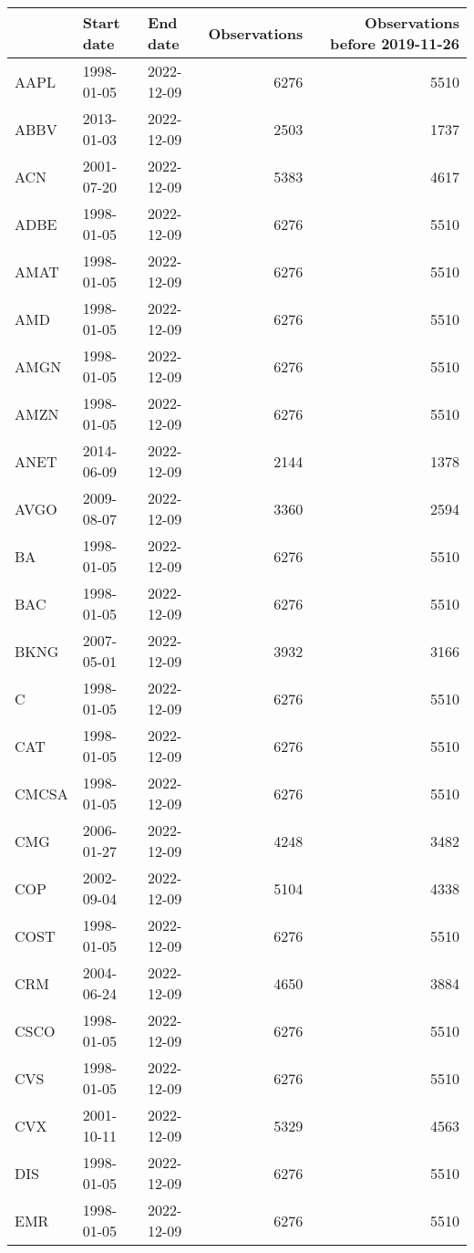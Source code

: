 \begin{table}[ht]
\centering
\begin{tabular}{lllrr}
  \hline
 & Start date & End date & Observations & Observations before 2019-11-26 \\ 
  \hline
AAPL & 1998-01-05 & 2022-12-09 & 6276 & 5510 \\ 
  ABBV & 2013-01-03 & 2022-12-09 & 2503 & 1737 \\ 
  ACN & 2001-07-20 & 2022-12-09 & 5383 & 4617 \\ 
  ADBE & 1998-01-05 & 2022-12-09 & 6276 & 5510 \\ 
  AMAT & 1998-01-05 & 2022-12-09 & 6276 & 5510 \\ 
  AMD & 1998-01-05 & 2022-12-09 & 6276 & 5510 \\ 
  AMGN & 1998-01-05 & 2022-12-09 & 6276 & 5510 \\ 
  AMZN & 1998-01-05 & 2022-12-09 & 6276 & 5510 \\ 
  ANET & 2014-06-09 & 2022-12-09 & 2144 & 1378 \\ 
  AVGO & 2009-08-07 & 2022-12-09 & 3360 & 2594 \\ 
  BA & 1998-01-05 & 2022-12-09 & 6276 & 5510 \\ 
  BAC & 1998-01-05 & 2022-12-09 & 6276 & 5510 \\ 
  BKNG & 2007-05-01 & 2022-12-09 & 3932 & 3166 \\ 
  C & 1998-01-05 & 2022-12-09 & 6276 & 5510 \\ 
  CAT & 1998-01-05 & 2022-12-09 & 6276 & 5510 \\ 
  CMCSA & 1998-01-05 & 2022-12-09 & 6276 & 5510 \\ 
  CMG & 2006-01-27 & 2022-12-09 & 4248 & 3482 \\ 
  COP & 2002-09-04 & 2022-12-09 & 5104 & 4338 \\ 
  COST & 1998-01-05 & 2022-12-09 & 6276 & 5510 \\ 
  CRM & 2004-06-24 & 2022-12-09 & 4650 & 3884 \\ 
  CSCO & 1998-01-05 & 2022-12-09 & 6276 & 5510 \\ 
  CVS & 1998-01-05 & 2022-12-09 & 6276 & 5510 \\ 
  CVX & 2001-10-11 & 2022-12-09 & 5329 & 4563 \\ 
  DIS & 1998-01-05 & 2022-12-09 & 6276 & 5510 \\ 
  EMR & 1998-01-05 & 2022-12-09 & 6276 & 5510 \\ 

\end{tabular}
\end{table}
